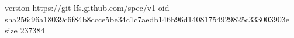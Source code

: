 version https://git-lfs.github.com/spec/v1
oid sha256:96a18039c6f84b8ccce5be34c1c7aedb146b96d14081754929825c333003903e
size 237384
